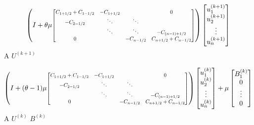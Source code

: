 \documentclass[a4paper,11pt]{article}
\theoremstyle{nonumberplain}
\theoremstyle{nonumberplain}
\theoremstyle{nonumberplain}
\begin{document}
    \begin{calculs}
        $$
        \left(
            I + \theta\mu
            \noindent
            \resizebox{0.60\linewidth}{!}{%
                $\begin{bmatrix}
                    C_{1 + 1/2} + C_{1 - 1/2} & -C_{1 + 1/2} & & 0\\
                    -C_{2 - 1/2} & \ddots & \ddots &  \\
                    & \ddots & \ddots &  -C_{(n - 1) + 1/2} \\
                    0 &  & -C_{n - 1/2} & C_{n + 1/2} + C_{n - 1/2}
                \end{bmatrix}$%
            }
        \right)
        \begin{bmatrix}
            u_{1}^{(k + 1)} \\
            u_{2}^{(k + 1)} \\
            \vdots \\
            u_{n}^{(k + 1)} \\
        \end{bmatrix}
        $$
        \hspace{42ex} A \hspace{30ex} $U^{(k + 1)}$
    \end{calculs}
    \begin{calculs}
        $$
        \left(
            I + (\theta - 1)\mu
            \noindent
            \resizebox{0.60\linewidth}{!}{%
                $\begin{bmatrix}
                    C_{1 + 1/2} + C_{1 - 1/2} & -C_{1 + 1/2} & & 0\\
                    -C_{2 - 1/2} & \ddots & \ddots &  \\
                    & \ddots & \ddots &  -C_{(n - 1) + 1/2} \\
                    0 &  & -C_{n - 1/2} & C_{n + 1/2} + C_{n - 1/2}
                \end{bmatrix}$%
            }
        \right)
        \begin{bmatrix}
            u_{1}^{(k)} \\
            u_{2}^{(k)} \\
            \vdots \\
            u_{n}^{(k)} \\
        \end{bmatrix}
        + \mu
        \begin{bmatrix}
            B_1^{(k)} \\
            0 \\
            \vdots \\
            0 \\
        \end{bmatrix}
        $$
        \hspace{42ex} A \hspace{27ex} $U^{(k)}$ \hspace{6ex} $B^{(k)}$
    \end{calculs}
\end{document}

